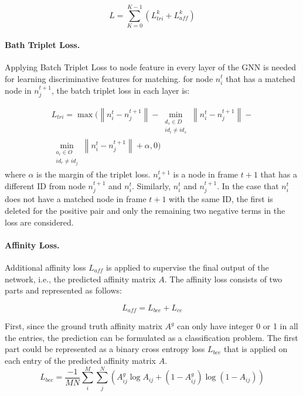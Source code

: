 \documentclass[10pt,twocolumn,letterpaper]{article}
\begin{document}
\begin{equation}
L = \sum^{K-1}_{K=0}(L^{k}_{tri} + L^{k}_{aff})
\end{equation}

\paragraph{Bath Triplet Loss.} Applying Batch Triplet Loss to node feature in every layer of the GNN is needed for learning discriminative features for matching. for node $n^{t}_{i}$ that has a matched node in $n^{t+1}_{j}$, the batch triplet loss in each layer is:

\begin{multline}
L_{tri} =  \max(\left\|n^{t}_{i} - n^{t+1}_{j}\right\| - \min_{\substack{\text{$d_{s}\in D$} \\ \text{$id_{i} \neq id_{s}$}}}
{\left\|n^{t}_{i} - n^{t+1}_{j}\right\|} -\\ \min_{\substack{\text{$o_{r} \in O$} \\ \text{$id_{r} \neq id_{j}$}}}{\left\| n^{t}_{i} - n^{t+1}_{j}\right\|}+ \alpha, 0)
\end{multline}
where $\alpha$ is the margin of the triplet loss. $n^{t+1}_{s}$ is a node in frame $t+1$ that has a different ID from node $n^{t+1}_{j}$ and $n^{t}_{i}$. Similarly, $n^{t}_{i}$ and $n^{t+1}_{j}$. In the case that $n^{t}_{i}$ does not have a matched node in frame $t+1$ with the same ID,  the first is deleted for the positive pair and only the remaining two negative terms in the loss are considered.

\paragraph{Affinity Loss.} Additional affinity loss $L_{aff}$ is applied to supervise the final output of the network, i.e., the predicted affinity matrix $A$. The affinity loss consists of two parts and represented as follows: 

\begin{equation}
L_{aff} = L_{bce} + L_{ce}
\end{equation}

First, since the ground truth affinity matrix $A^{g}$ can only have integer 0 or 1 in all the entries, the prediction can be formulated as a classification problem. The first part could be represented as a binary cross entropy loss $L_{bce}$ that is applied on each entry of the predicted affinity matrix $A$.
\begin{equation}
L_{bce} = \frac{-1}{MN}\sum^{M}_{i}\sum^{N}_{j}(A^{g}_{ij} \log A_{ij} +(1-A^{g}_{ij})\log(1-A_{ij}))
\end{equation}
\end{document}
